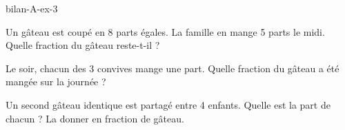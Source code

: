 \begin{blocEdition}{bilan-A-ex-3}
\begin{questions}
\item Un gâteau est coupé en 8 parts égales. La famille en mange 5 parts le midi. Quelle fraction du gâteau reste-t-il ?
\item Le soir, chacun des 3 convives mange une part. Quelle fraction du gâteau a été mangée sur la journée ?
\item Un second gâteau identique est partagé entre 4 enfants. Quelle est la part de chacun ? La donner en fraction de gâteau.
\end{questions}\par{}\par\par{}\par{}\par{}\par{}\par{}\par{}
\end{blocEdition}
